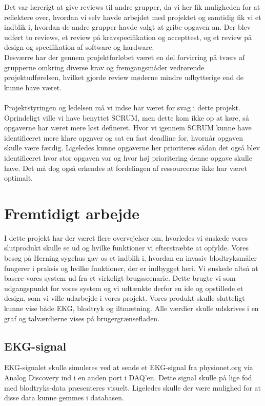 Det var lærerigt at give reviews til andre grupper, da vi her fik muligheden for at reflektere over, hvordan vi selv havde arbejdet med projektet og samtidig fik vi et indblik i, hvordan de andre grupper havde valgt at gribe opgaven an. Der blev udført to reviews, et review på kravspecifikation og accepttest, og et review på design og specifikation af software og hardware. \\ Desværre har der gennem projektforløbet været en del forvirring på tværs af grupperne omkring diverse krav og fremgangsmåder vedrørende projektudførelsen, hvilket gjorde review møderne mindre udbytterige end de kunne have været.\\\\
Projektstyringen og ledelsen må vi indse har været for svag i dette projekt. Oprindeligt ville vi have benyttet SCRUM, men dette kom ikke op at køre, så opgaverne har været mere løst defineret. Hvor vi igennem SCRUM kunne have identificeret mere klare opgaver og sat en fast deadline for, hvornår opgaven skulle være færdig. Ligeledes kunne opgaverne her prioriteres sådan det også blev identificeret hvor stor opgaven var og hvor høj prioritering denne opgave skulle have. Det må dog også erkendes at fordelingen af ressourcerne ikke har været optimalt. 
\section{Fremtidigt arbejde}
I dette projekt har der været flere overvejelser om, hvorledes vi ønskede vores slutprodukt skulle se ud og hvilke funktioner vi efterstræbte at opfylde. Vores besøg på Herning sygehus gav os et indblik i, hvordan en invasiv blodtryksmåler fungerer i praksis og hvilke funktioner, der er indbygget heri. Vi ønskede altså at basere vores system ud fra et virkeligt brugsscenarie. Dette brugte vi som udgangspunkt for vores system og vi udtænkte derfor en ide og opstillede et design, som vi ville udarbejde i vores projekt. Vores produkt skulle slutteligt kunne vise både EKG, blodtryk og iltmætning. Alle værdier skulle udskrives i en graf og talværdierne vises på brugergrænsefladen. 
\subsection{EKG-signal}
EKG-signalet skulle simuleres ved at sende et EKG-signal fra physionet.org via Analog Discovery ind i en anden port i DAQ’en. Dette signal skulle på lige fod med blodtryks-data præsenteres visuelt. Ligeledes skulle der være mulighed for at disse data kunne gemmes i databasen.

